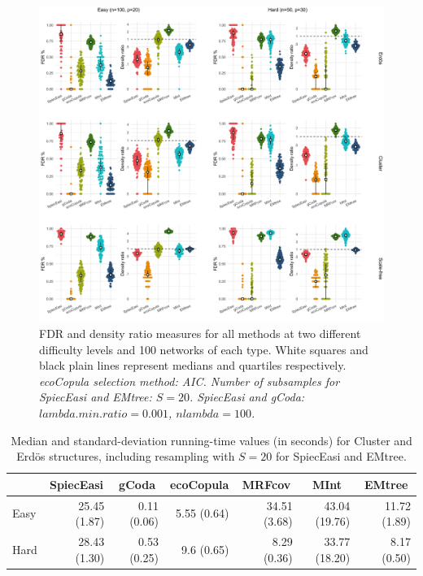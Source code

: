 \begin{figure}[H]
    \centering
    \includegraphics[width=\linewidth]{figs/panel_TPFN_signed.png}
    \caption{FDR and density ratio measures for all methods at two different difficulty levels and 100 networks of each type. White squares and black plain lines represent medians and quartiles respectively. \small{\textit{ecoCopula selection method: AIC. Number of subsamples for SpiecEasi and EMtree: $S=20$. SpiecEasi and gCoda: $lambda.min.ratio=0.001$,  $nlambda=100$.}}}
    \label{TPFN}
\end{figure}

\begin{table}[ht]
\centering
 
\begin{tabular}{l|rrrrrr}
 & \multicolumn{1}{c}{SpiecEasi} & \multicolumn{1}{c}{gCoda} & \multicolumn{1}{c}{ecoCopula} & \multicolumn{1}{c}{MRFcov} & \multicolumn{1}{c}{MInt} & \multicolumn{1}{c}{EMtree} \\ 
  \hline
Easy & 25.45  (1.87) & 0.11  (0.06) & 5.55  (0.64) & 34.51  (3.68) & 43.04  (19.76) & 11.72  (1.89) \\ 
  Hard & 28.43  (1.30) & 0.53  (0.25) & 9.6  (0.65) & 8.29  (0.36) & 33.77  (18.20) & 8.17  (0.50) \\ 
   \hline
\end{tabular}
\caption{Median and standard-deviation running-time values (in seconds) for Cluster and Erdös structures, including resampling with $S=20$ for SpiecEasi and EMtree.}
\label{timesTPFN}
\end{table}





